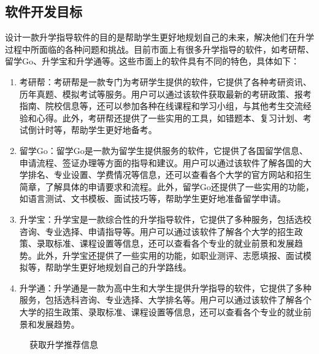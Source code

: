 \documentclass[UTF8]{ctexart}
\newcommand{\ch}[1]{\textcolor{ChatGPT}{#1}}
\newcommand{\m}[1]{\textcolor{modify}{#1}}
\begin{document}
    \subsection{软件开发目标}
    \par
    \m{设计一款升学指导软件的目的是帮助学生更好地规划自己的未来，解决他们在升学过程中所面临的各种问题和挑战}。目前市面上有很多升学指导的软件，\m{如考研帮、留学Go、升学宝和升学通等}。这些市面上的软件具有不同的特色，具体如下：
    
    \begin{enumerate}
        \item 考研帮：\ch{考研帮是一款专门为考研学生提供的软件，它提供了各种考研资讯、历年真题、模拟考试等服务。用户可以通过该软件获取最新的考研政策、报考指南、院校信息等，还可以参加各种在线课程和学习小组，与其他考生交流经验和心得。此外，考研帮还提供了一些实用的工具，如错题本、复习计划、考试倒计时等，帮助学生更好地备考。}
        \item 留学Go：\ch{留学Go是一款为留学生提供服务的软件，它提供了各国留学信息、申请流程、签证办理等方面的指导和建议。用户可以通过该软件了解各国的大学排名、专业设置、学费情况等信息，还可以查看各个大学的官方网站和招生简章，了解具体的申请要求和流程。此外，留学Go还提供了一些实用的功能，如语言测试、文书模板、面试技巧等，帮助学生更好地准备留学申请。}
        \item 升学宝：\ch{升学宝是一款综合性的升学指导软件，它提供了多种服务，包括选校咨询、专业选择、申请指导等。用户可以通过该软件了解各个大学的招生政策、录取标准、课程设置等信息，还可以查看各个专业的就业前景和发展趋势。此外，升学宝还提供了一些实用的功能，如职业测评、志愿填报、面试模拟等，帮助学生更好地规划自己的升学路线。}
        \item 升学通：\ch{升学通是一款为高中生和大学生提供升学指导的软件，它提供了多种服务，包括选科咨询、专业选择、大学排名等。用户可以通过该软件了解各个大学的招生政策、录取标准、课程设置等信息，还可以查看各个专业的就业前景和发展趋势。}
    \end{enumerate}

    \begin{figure}[htp]
        \centering
        \caption{\m{获取升学推荐信息}}
        \label{fig:element}
    \end{figure}
\end{document}
